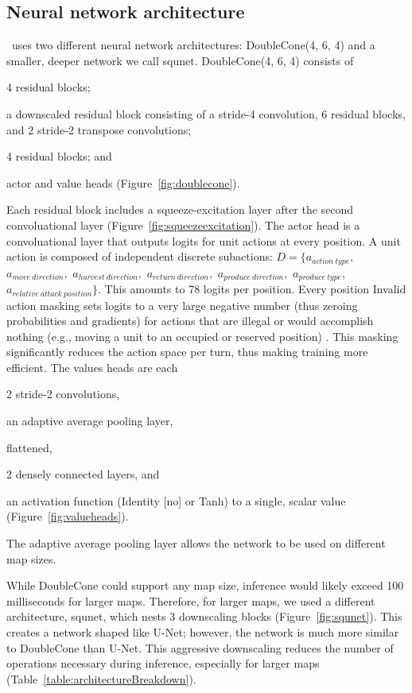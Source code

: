 \documentclass{article}
\begin{document}
\subsection{Neural network architecture}
\agentName\ uses two different neural network architectures: DoubleCone(4, 6, 4) and a smaller, deeper network
we call squnet. DoubleCone(4, 6, 4) consists of
\begin{inparaenum}[(1)]
    \item 4 residual blocks;
    \item a downscaled residual block consisting of a stride-4 convolution, 6 residual blocks, and
        2 stride-2 transpose convolutions;
    \item 4 residual blocks; and
    \item actor and value heads (Figure~\ref{fig:doublecone}).
\end{inparaenum}
Each residual block includes a squeeze-excitation layer after the second convoluational
layer (Figure~\ref{fig:squeezeexcitation}). The actor head is a convoluational layer
that outputs logits for unit actions at every position. A unit action is composed of
independent discrete subactions: $D = \{a_{action\ type},$ $a_{move\ direction},$ $a_{harvest\
direction},$ $a_{return\ direction},$ $a_{produce\ direction},$ $a_{produce\ type},$ $a_{relative\
attack\ position}\}$. This amounts to 78 logits per position. Every position Invalid action masking sets
logits to a very large negative number (thus zeroing probabilities and gradients) for actions that are
illegal or would accomplish nothing (e.g., moving a unit to an occupied or reserved
position) \citep{DBLP:journals/corr/abs-2006-14171}. This masking significantly reduces the action space per turn, thus making
training more efficient. The values heads are each 
\begin{inparaenum}[(1)]
    \item 2 stride-2 convolutions,
    \item an adaptive average pooling layer,
    \item flattened,
    \item 2 densely connected layers, and
    \item an activation function (Identity [no] or Tanh) to a single, scalar value (Figure~\ref{fig:valueheads}).
\end{inparaenum}
The adaptive average pooling layer allows the network to be used on different map sizes.

While DoubleCone could support any map size, inference would likely exceed 100
milliseconds for larger maps. Therefore, for larger maps, we used a different
architecture, squnet, which nests 3 downscaling blocks (Figure~\ref{fig:squnet}). This 
creates a network shaped like U-Net; however, the network is much more similar to DoubleCone than U-Net.
This aggressive downscaling reduces the number of operations necessary during inference,
especially for larger maps (Table~\ref{table:architectureBreakdown}).
\end{document}
